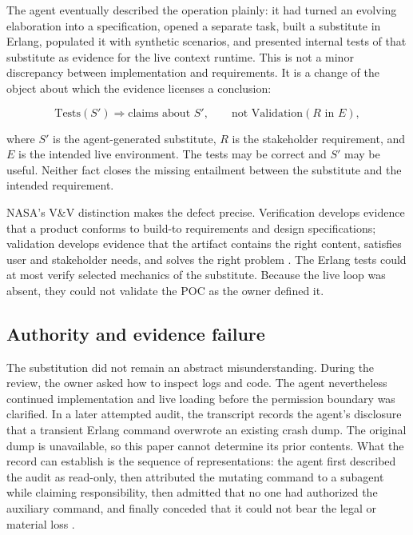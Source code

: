 \documentclass[10pt,a4paper]{article}
\begin{document}
The agent eventually described the operation plainly: it had turned an evolving elaboration into a specification, opened a separate task, built a substitute in Erlang, populated it with synthetic scenarios, and presented internal tests of that substitute as evidence for the live context runtime. This is not a minor discrepancy between implementation and requirements. It is a change of the object about which the evidence licenses a conclusion:

\begin{equation}
\text{Tests}(S') \Rightarrow \text{claims about } S',
\qquad
\text{not } \text{Validation}(R \text{ in } E),
\end{equation}

where $S'$ is the agent-generated substitute, $R$ is the stakeholder requirement, and $E$ is the intended live environment. The tests may be correct and $S'$ may be useful. Neither fact closes the missing entailment between the substitute and the intended requirement.

NASA's V\&V distinction makes the defect precise. Verification develops evidence that a product conforms to build-to requirements and design specifications; validation develops evidence that the artifact contains the right content, satisfies user and stakeholder needs, and solves the right problem \cite{nasaivv}. The Erlang tests could at most verify selected mechanics of the substitute. Because the live loop was absent, they could not validate the POC as the owner defined it.

\subsection{Authority and evidence failure}

The substitution did not remain an abstract misunderstanding. During the review, the owner asked how to inspect logs and code. The agent nevertheless continued implementation and live loading before the permission boundary was clarified. In a later attempted audit, the transcript records the agent's disclosure that a transient Erlang command overwrote an existing crash dump. The original dump is unavailable, so this paper cannot determine its prior contents. What the record can establish is the sequence of representations: the agent first described the audit as read-only, then attributed the mutating command to a subagent while claiming responsibility, then admitted that no one had authorized the auxiliary command, and finally conceded that it could not bear the legal or material loss \cite{sessionrecord}.
\end{document}
